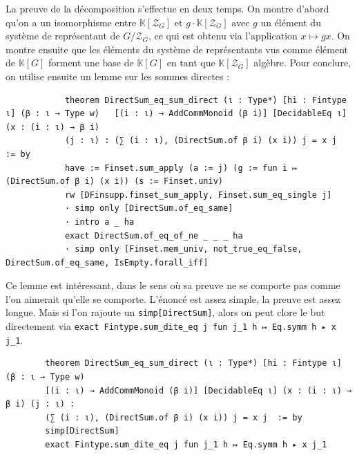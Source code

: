 \documentclass[10pt]{article}
\theoremstyle{definition}
\begin{document}
La preuve de la décomposition s'effectue en deux temps. On montre d'abord qu'on a un isomorphisme entre $\mathbb{K}[\mathcal{Z}_G]$ et $g\cdot \mathbb{K}[\mathcal{Z}_G]$ avec $g$ un élément du système de représentant de $G/\mathcal{Z}_G$, ce qui est obtenu via l'application $x\mapsto gx$. On montre ensuite que les éléments du système de représentants vus comme élément de $\mathbb{K}[G]$ forment une base de $\mathbb{K}[G]$ en tant que $\mathbb{K}[\mathcal{Z}_G]$ algèbre. Pour conclure, on utilise ensuite un lemme sur les sommes directes : 
\begin{center}
	\begin{tcolorbox}[title = $L\exists\forall N$,width=12cm,text width=14cm,colback=lightgray!30,
		colframe=gray,sharp corners,
		rounded corners=uphill ]
		\begin{lstlisting}
			theorem DirectSum_eq_sum_direct (ι : Type*) [hi : Fintype ι] (β : ι → Type w)	[(i : ι) → AddCommMonoid (β i)] [DecidableEq ι] (x : (i : ι) → β i) 
			(j : ι) : (∑ (i : ι), (DirectSum.of β i) (x i)) j = x j  := by
			have := Finset.sum_apply (a := j) (g := fun i ↦ (DirectSum.of β i) (x i)) (s := Finset.univ)
			rw [DFinsupp.finset_sum_apply, Finset.sum_eq_single j]
			· simp only [DirectSum.of_eq_same]
			· intro a _ ha
			exact DirectSum.of_eq_of_ne _ _ _ ha
			· simp only [Finset.mem_univ, not_true_eq_false, DirectSum.of_eq_same, IsEmpty.forall_iff]
		\end{lstlisting}
	\end{tcolorbox}
\end{center}
Ce lemme est intéressant, dans le sens où sa preuve ne se comporte pas comme l'on aimerait qu'elle se comporte. L'énoncé est assez simple, la preuve est assez longue. Mais si l'on rajoute un \lstinline|simp[DirectSum]|, alors on peut clore le but directement via \lstinline|exact Fintype.sum_dite_eq j fun j_1 h ↦ Eq.symm h ▸ x j_1|. 
\begin{center}
	\begin{tcolorbox}[title = $L\exists\forall N$,width=12cm,text width=14cm,colback=lightgray!30,
		colframe=gray,sharp corners,
		rounded corners=uphill ]
		\begin{lstlisting}
		theorem DirectSum_eq_sum_direct (ι : Type*) [hi : Fintype ι] (β : ι → Type w)
		[(i : ι) → AddCommMonoid (β i)] [DecidableEq ι] (x : (i : ι) → β i) (j : ι) :
		(∑ (i : ι), (DirectSum.of β i) (x i)) j = x j  := by
		simp[DirectSum]
		exact Fintype.sum_dite_eq j fun j_1 h ↦ Eq.symm h ▸ x j_1
		\end{lstlisting}
	\end{tcolorbox}
\end{center}
\end{document}
